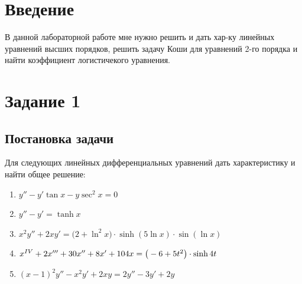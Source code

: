 \documentclass[a4paper, 14pt, fleqn]{extarticle}
\begin{document}
	\pagebreak	

	\section{Введение}
		В данной лабораторной работе мне нужно решить и дать хар-ку линейных уравнений высших порядков, решить задачу Коши для уравнений 2-го порядка и
		найти коэффициент логистичекого уравнения.
	\pagebreak
	\section{Задание 1}
		\subsection{Постановка задачи}
			\noindent Для следующих линейных дифференциальных уравнений дать характеристику
					и найти общее решение:
		\begin{enumerate}
			\item \(y'' - y'\tan{x} - y\sec^2{x} = 0 \)
			\item \(y'' - y' = \tanh{x} \)	
			\item \(x^2y'' + 2xy' = \Big(2 + \ln^2{x}\Big)\cdot \sinh{(5\ln{x})} \cdot \sin{(\ln{x})} \)
			\item \(x^{\MakeUppercase{\romannumeral 4}} + 2x''' + 30x'' + 8x' + 104x = \big(-6 + 5t^2\big) \cdot \sinh{4t} \)
			\item \((x-1)^2y'' - x^2y' + 2xy = 2y'' -3y' + 2y \)
		\end{enumerate}
\end{document}
